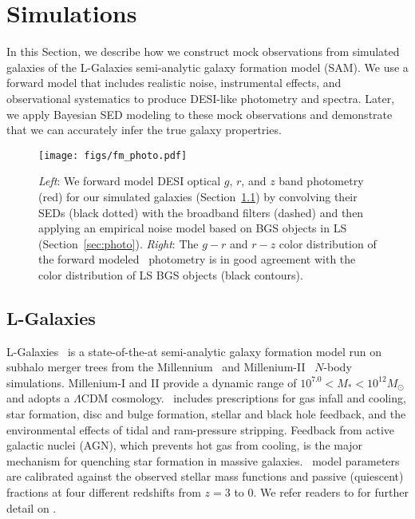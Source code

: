 \section{Simulations}\label{sec:sims}
In this Section, we describe how we construct mock observations from simulated
galaxies of the {\sc L-Galaxies} semi-analytic galaxy formation model (SAM).
We use a forward model that includes realistic noise, instrumental effects, and
observational systematics to produce DESI-like photometry and spectra. 
Later, we apply Bayesian SED modeling to these mock observations and
demonstrate that we can accurately infer the true galaxy propertries.

\begin{figure}
\begin{center}
\texttt{[image: figs/fm\_photo.pdf]}
\caption{{\em Left}: We forward model DESI optical $g$, $r$, and $z$ band
    photometry (red) for our simulated galaxies (Section~\ref{sec:lgal}) by
    convolving their SEDs (black dotted) with the broadband filters (dashed)
    and then applying an empirical noise model based on BGS objects in LS
    (Section~\ref{sec:photo}).
    {\em Right}: The $g-r$ and $r-z$ color distribution of the forward modeled
    \lgal~photometry is in good agreement with the color distribution of LS BGS
    objects (black contours).} \label{fig:photo}
\end{center}
\end{figure}

\subsection{L-Galaxies} \label{sec:lgal}
{\sc L-Galaxies}~\citep[hereafter \lgal;][]{henriques2015} is a state-of-the-at
semi-analytic galaxy formation model run on subhalo merger trees from the
Millennium~\citep{springel2005a} and Millenium-II~\citep{boylan-kolchin2009}
$N$-body simulations. 
Millenium-I and II provide a dynamic range of $10^{7.0} < M_* < 10^{12}
M_\odot$ and adopts a \cite{planckcollaboration2014a} $\Lambda$CDM cosmology.
\lgal~includes prescriptions for gas infall and cooling, star formation, disc
and bulge formation, stellar and black hole feedback, and the environmental
effects of tidal and ram-pressure stripping.
Feedback from active galactic nuclei (AGN), which prevents hot gas from
cooling, is the major mechanism for quenching star formation in massive
galaxies.
\lgal~model parameters are calibrated against the observed stellar mass
functions and passive (quiescent) fractions at four different redshifts from 
$z = 3$ to 0.
We refer readers to \cite{henriques2015} for further detail on \lgal.

